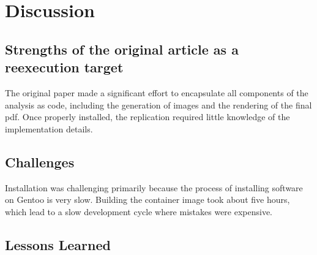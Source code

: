 \section{Discussion}

\subsection{Strengths of the original article as a reexecution target}
The original paper made a significant effort to encapsulate all
components of the analysis as code, including the generation of images
and the rendering of the final pdf. Once properly installed, the
replication required little knowledge of the implementation details.

\subsection{Challenges}
Installation was challenging primarily because the process of installing
software on Gentoo is very slow. Building the container image took
about five hours, which lead to a slow development cycle where mistakes
were expensive.

\subsection{Lessons Learned}

